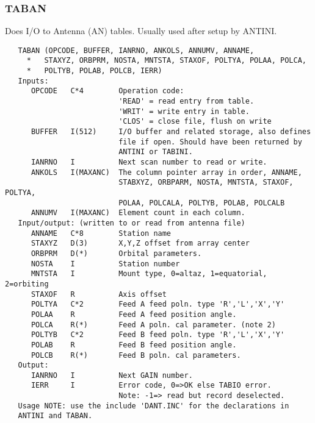 \subsubsection{TABAN}
Does I/O to Antenna (AN) tables. Usually used after setup by ANTINI.
\begin{verbatim}
   TABAN (OPCODE, BUFFER, IANRNO, ANKOLS, ANNUMV, ANNAME,
     *   STAXYZ, ORBPRM, NOSTA, MNTSTA, STAXOF, POLTYA, POLAA, POLCA,
     *   POLTYB, POLAB, POLCB, IERR)
   Inputs:
      OPCODE   C*4        Operation code:
                          'READ' = read entry from table.
                          'WRIT' = write entry in table.
                          'CLOS' = close file, flush on write
      BUFFER   I(512)     I/O buffer and related storage, also defines
                          file if open. Should have been returned by
                          ANTINI or TABINI.
      IANRNO   I          Next scan number to read or write.
      ANKOLS   I(MAXANC)  The column pointer array in order, ANNAME,
                          STABXYZ, ORBPARM, NOSTA, MNTSTA, STAXOF, POLTYA,
                          POLAA, POLCALA, POLTYB, POLAB, POLCALB
      ANNUMV   I(MAXANC)  Element count in each column.
   Input/output: (written to or read from antenna file)
      ANNAME   C*8        Station name
      STAXYZ   D(3)       X,Y,Z offset from array center
      ORBPRM   D(*)       Orbital parameters.
      NOSTA    I          Station number
      MNTSTA   I          Mount type, 0=altaz, 1=equatorial, 2=orbiting
      STAXOF   R          Axis offset
      POLTYA   C*2        Feed A feed poln. type 'R','L','X','Y'
      POLAA    R          Feed A feed position angle.
      POLCA    R(*)       Feed A poln. cal parameter. (note 2)
      POLTYB   C*2        Feed B feed poln. type 'R','L','X','Y'
      POLAB    R          Feed B feed position angle.
      POLCB    R(*)       Feed B poln. cal parameters.
   Output:
      IANRNO   I          Next GAIN number.
      IERR     I          Error code, 0=>OK else TABIO error.
                          Note: -1=> read but record deselected.
   Usage NOTE: use the include 'DANT.INC' for the declarations in
   ANTINI and TABAN.
\end{verbatim}

